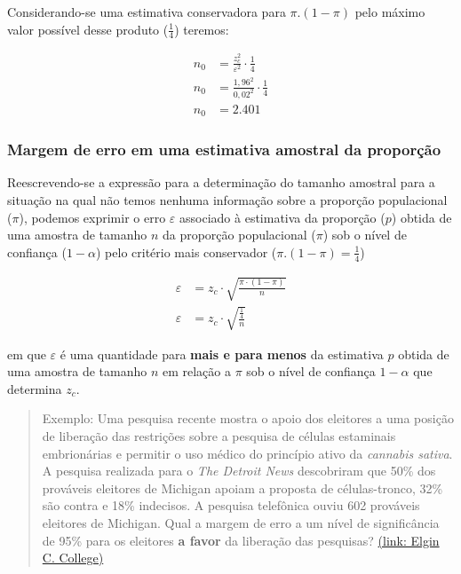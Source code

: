 \documentclass[
]{book}
\begin{document}
\hfill\break

Considerando-se uma estimativa conservadora para \(\pi.(1-\pi)\) pelo máximo valor possível desse produto (\(\frac{1}{4}\)) teremos:

\hfill\break

\begin{align*}
n_{0} & =  \frac{z_{c}^{2}}{\varepsilon^{2}} \cdot \frac{1}{4} \\
n_{0} & =  \frac{1,96^{2}}{0,02^{2}} \cdot \frac{1}{4} \\
n_{0} & =  2.401
\end{align*}

\hfill\break

\hypertarget{margem-de-erro-em-uma-estimativa-amostral-da-proporuxe7uxe3o}{%
\subsubsection{Margem de erro em uma estimativa amostral da proporção}\label{margem-de-erro-em-uma-estimativa-amostral-da-proporuxe7uxe3o}}

\hfill\break

Reescrevendo-se a expressão para a determinação do tamanho amostral para a situação na qual não temos nenhuma informação sobre a proporção populacional (\(\pi\)), podemos exprimir o erro \(\varepsilon\) associado à estimativa da proporção (\(p\)) obtida de uma amostra de tamanho \(n\) da proporção populacional (\(\pi\)) sob o nível de confiança (\(1-\alpha\)) pelo critério mais conservador (\(\pi.(1-\pi)=\frac{1}{4}\))

\hfill\break

\begin{align*}
\varepsilon & = z_{c}\cdot \sqrt{\frac{\pi\cdot \left(1-\pi\right)}{n}} \\
\varepsilon & = z_{c}\cdot \sqrt{\frac{\frac{1}{4}}{n}}
\end{align*}

\hfill\break

em que \(\varepsilon\) é uma quantidade para \textbf{mais e para menos} da estimativa \(p\) obtida de uma amostra de tamanho \(n\) em relação a \(\pi\) sob o nível de confiança \(1-\alpha\) que determina \(z_{c}\).

\hfill\break

\begin{quote}
Exemplo: Uma pesquisa recente mostra o apoio dos eleitores a uma posição de liberação das restrições sobre a pesquisa de células estaminais embrionárias e permitir o uso médico do princípio ativo da \textit{cannabis sativa}. A pesquisa realizada para o \textit{The Detroit News} descobriram que 50\% dos prováveis eleitores de Michigan apoiam a proposta de células-tronco, 32\% são contra e 18\% indecisos. A pesquisa telefônica ouviu 602 prováveis eleitores de Michigan. Qual a margem de erro a um nível de significância de 95\% para os eleitores \textbf{a favor} da liberação das pesquisas?
\href{https://faculty.elgin.edu/dkernler/statistics/ch09/9-1.html}{(link: Elgin C. College)}
\end{quote}
\end{document}
